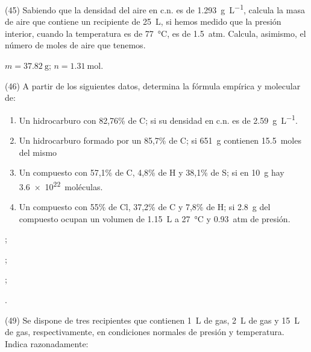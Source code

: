 \documentclass[10pt]{article}
\begin{document}
\begin{multicols}{2}
\begin{exercise}
  (45) Sabiendo que la densidad del aire en c.n. es de \SI{1.293}{\gram\per\liter}, calcula la masa de aire que contiene un recipiente de \SI{25}{\liter}, si hemos medido que la presión interior, cuando la temperatura es de \SI{77}{\celsius}, es de \SI{1.5}{atm}. Calcula, asimismo, el número de moles de aire que tenemos.
\end{exercise}

\begin{solution}
  \( m = \SI{37.82}{\gram} \); \( n = \SI{1.31}{\mole} \).
\end{solution}


\begin{exercise}
  (46) A partir de los siguientes datos, determina la fórmula empírica y molecular de:

  \begin{enumerate}
    \item Un hidrocarburo con 82,76\% de C; si su densidad en c.n. es de \SI{2.59}{\gram\per\liter}.
    \item Un hidrocarburo formado por un 85,7\% de C; si \SI{651}{\gram} contienen \SI{15.5}{moles} del mismo
    \item Un compuesto con 57,1\% de C, 4,8\% de H y 38,1\% de S; si en \SI{10}{\gram} hay \SI{3.6e22}{moléculas}.
    \item Un compuesto con 55\% de Cl, 37,2\% de C y 7,8\% de H; si \SI{2.8}{\gram} del compuesto ocupan un volumen de \SI{1.15}{\liter} a \SI{27}{\celsius} y \SI{0.93}{atm} de presión.
  \end{enumerate}
\end{exercise}

\begin{solution}
  \begin{enumerate*}
    \item {};
    \item {};
    \item {};
    \item {}.
  \end{enumerate*}
\end{solution}


\begin{exercise}
  (49) Se dispone de tres recipientes que contienen \SI{1}{\liter} de  gas, \SI{2}{\liter} de  gas y \SI{15}{\liter} de  gas, respectivamente, en condiciones normales de presión y temperatura. Indica razonadamente:


\end{exercise}
\end{multicols}
\end{document}
